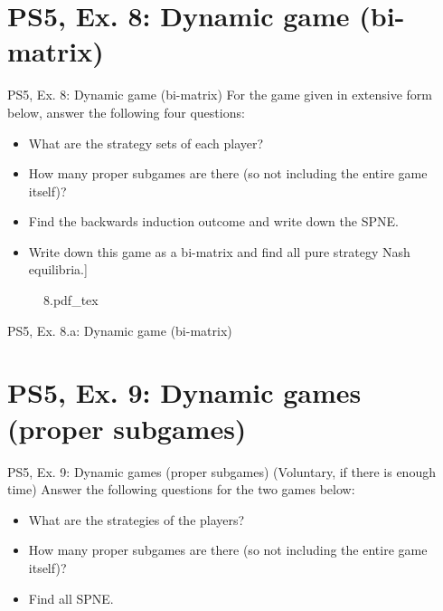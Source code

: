\section{PS5, Ex. 8: Dynamic game (bi-matrix)}

\begin{frame}{PS5, Ex. 8: Dynamic game (bi-matrix)}
  For the game given in extensive form below, answer the following four questions:
  \begin{itemize}
    \item[(a)] What are the strategy sets of each player?
    \item[(b)] How many proper subgames are there (so not including the entire game itself)?
    \item[(c)] Find the backwards induction outcome and write down the SPNE.
    \item[(d)] Write down this game as a bi-matrix and find all pure strategy Nash equilibria.]
  \end{itemize}
  \begin{figure}[!h]
    \center
    \def\svgwidth{\columnwidth}
    {8.pdf_tex}
  \end{figure}
  \vfill\null
\end{frame}

\begin{frame}{PS5, Ex. 8.a: Dynamic game (bi-matrix)}
  \begin{multicols}{2}
    \vfill\null \columnbreak
    \vfill\null
  \end{multicols}
\end{frame}



\section{PS5, Ex. 9: Dynamic games (proper subgames)}

\begin{frame}{PS5, Ex. 9: Dynamic games (proper subgames)}
  (Voluntary, if there is enough time) Answer the following questions for the two games below:
  \begin{itemize}
    \item What are the strategies of the players?
    \item How many proper subgames are there (so not including the entire game itself)?
    \item Find all SPNE.
  \end{itemize}
\end{frame}

